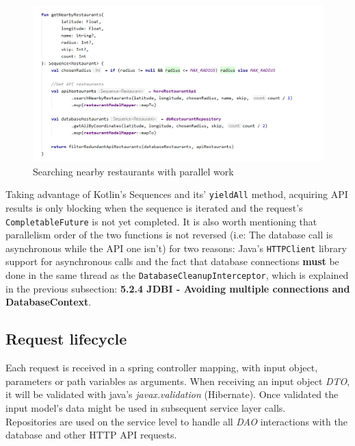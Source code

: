 \begin{figure}[H]
    \begin{center}
        \includegraphics[scale=0.6]{_figures/Searching nearby restaurants with parallel work.png}
        \caption{Searching nearby restaurants with parallel work}
    \end{center}
\end{figure}

Taking advantage of Kotlin's Sequences and its' \texttt{yieldAll} method, acquiring API results is only blocking when the sequence is iterated and
the request's \texttt{CompletableFuture} is not yet completed.
It is also worth mentioning that parallelism order of the two functions is not reversed 
(i.e: The database call is asynchronous while the API one isn't) for two reasons: 
Java's \texttt{HTTPClient} library support for asynchronous calls and the fact that database connections \textbf{must} be done in the same thread as the
\texttt{DatabaseCleanupInterceptor}, which is explained in the previous subsection: \textbf{5.2.4 JDBI - Avoiding multiple connections and DatabaseContext}.\\

\subsection{Request lifecycle}
Each request is received in a spring controller mapping, with input object,
parameters or path variables as arguments. When receiving an input object \textit{DTO},
it will be validated with java's \textit{javax.validation} (Hibernate).
Once validated the input model's data might be used in subsequent service layer calls.\\

Repositories are used on the service level to handle all \textit{DAO} interactions with
the database and other HTTP API requests.\\

